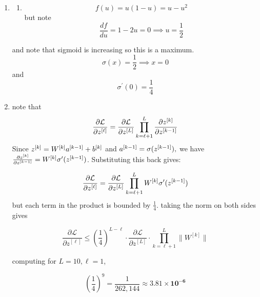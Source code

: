 \documentclass{report}
\begin{document}
\begin{enumerate}
    \item [Q2] 
    \begin{enumerate}
        \item \begin{equation}
            f(u) = u(1 - u) = u - u^2
        \end{equation}
        but note
    \begin{equation}
        \frac{df}{du} = 1 - 2u = 0 \implies u = \frac{1}{2}
    \end{equation}
    \end{enumerate}
    and note that sigmoid is increasing so this is a maximum.
    \begin{equation}
        \sigma(x) = \frac{1}{2} \implies x=0
    \end{equation}
    and 
    \begin{equation}
        \sigma^\prime (0) = \frac{1}{4}
    \end{equation}
    \item
    note that
    \begin{equation}
        \frac{\partial \mathcal{L}}{\partial z^{[\ell]}} = \frac{\partial \mathcal{L}}{\partial z^{[L]}} \prod_{k=\ell+1}^{L} \frac{\partial z^{[k]}}{\partial z^{[k-1]}}
    \end{equation}
    Since \(z^{[k]} = W^{[k]}a^{[k-1]} + b^{[k]}\) and \(a^{[k-1]} = \sigma(z^{[k-1]}),\) we have \(\frac{\partial z^{[k]}}{\partial z^{[k-1]}} = W^{[k]} \sigma'(z^{[k-1]})\). Substituting this back gives:
    
    \begin{equation}
        \frac{\partial \mathcal{L}}{\partial z^{[\ell]}} = \frac{\partial \mathcal{L}}{\partial z^{[L]}} \prod_{k=\ell+1}^{L} W^{[k]} \sigma'(z^{[k-1]})
    \end{equation}
    but each term in the product is bounded by \(\frac{1}{4}\). taking the norm on both sides gives 

    \begin{equation}
        \frac{\partial \mathcal{L}}{\partial z^{[\ell]}} \le \left( \frac{1}{4} \right)^{L-\ell} \cdot \frac{\partial \mathcal{L}}{\partial z^{[L]}} \cdot \prod_{k=\ell+1}^{L} \parallel W^{[k]} \parallel
    \end{equation}

    computing for \(L=10, \ell = 1\), 

    $$\left(\frac{1}{4}\right)^{9} = \frac{1}{262,144} \approx \mathbf{3.81 \times 10^{-6}}$$


\end{enumerate}
\end{document}
